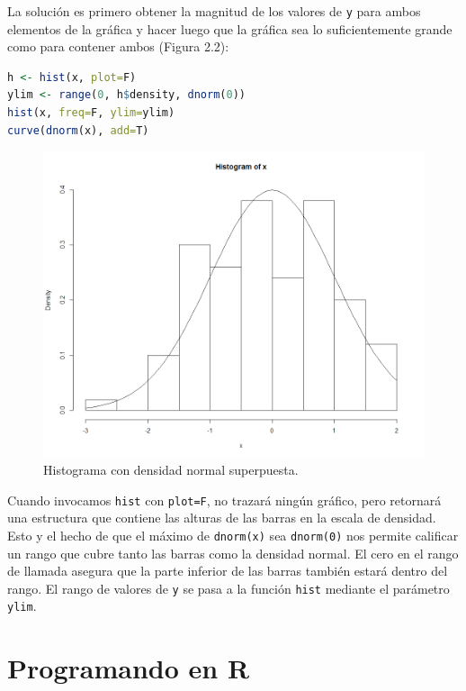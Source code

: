 La solución es primero obtener la magnitud de los valores de \texttt{y} para ambos
elementos de la gráfica y hacer luego  que la gráfica sea lo suficientemente grande
como para contener ambos (Figura 2.2):

\begin{lstlisting}[language=R]
h <- hist(x, plot=F)
ylim <- range(0, h$density, dnorm(0))
hist(x, freq=F, ylim=ylim)
curve(dnorm(x), add=T)
\end{lstlisting}

\begin{figure}[H]
  \includegraphics[width=\linewidth]{fig-6.png}
  \caption{Histograma con densidad normal superpuesta.}
  \label{fig:fig-6}
\end{figure}

Cuando invocamos \texttt{hist} con \texttt{plot=F}, no trazará ningún gráfico,
pero retornará una estructura que contiene las alturas de las barras en la
escala de densidad. Esto y el hecho de que el máximo de \texttt{dnorm(x)} sea
\texttt{dnorm(0)} nos permite calificar un rango que cubre tanto las barras como
la densidad normal. El cero en el rango de llamada asegura que la parte inferior
de las barras también estará dentro del rango.  El rango de valores de
\texttt{y} se pasa a la función \texttt{hist} mediante el parámetro
\texttt{ylim}.

\section{Programando en \textbf{R}}


